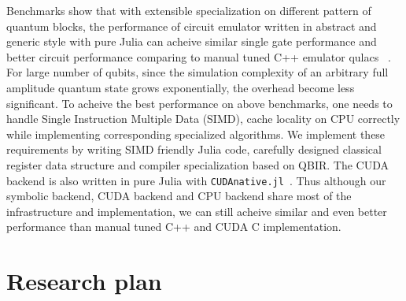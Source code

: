 \documentclass[]{article}
\begin{document}
Benchmarks show that with extensible specialization on different pattern of quantum blocks, the performance of
circuit emulator written in abstract and generic style with pure Julia can acheive similar single gate performance and
better circuit performance comparing to manual tuned C++ emulator qulacs~\cite{qulacs2019variational} . For large number of qubits, since the
simulation complexity of an arbitrary full amplitude quantum state grows exponentially, the overhead become less significant.
To acheive the best performance on above benchmarks, one needs to handle Single Instruction
Multiple Data (SIMD), cache locality on CPU correctly while implementing corresponding specialized algorithms.
We implement these requirements by writing SIMD friendly Julia code, carefully designed classical register data structure and
compiler specialization based on QBIR. The CUDA backend is also written in pure Julia with \texttt{CUDAnative.jl}~\cite{besard2018effective}.
Thus although our symbolic backend, CUDA backend and CPU backend share most of the infrastructure and
implementation, we can still acheive similar and even better performance than manual tuned C++ and CUDA C implementation.


\section{Research plan}
\end{document}

